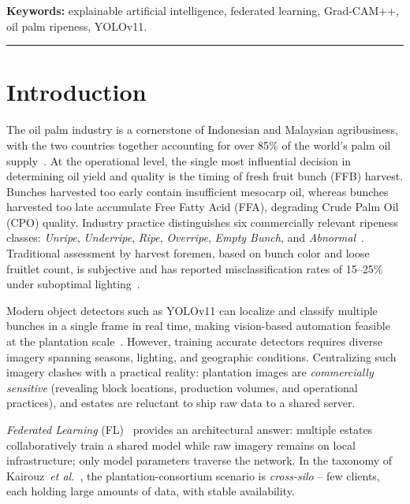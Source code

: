 \documentclass[a4paper,10pt]{article}
\begin{document}
\vspace{0.5em}
\noindent\textbf{Keywords:} explainable artificial intelligence, federated
learning, Grad-CAM++, oil palm ripeness, YOLOv11.

\vspace{1em}
\hrule
\vspace{1em}

\section{Introduction}
The oil palm industry is a cornerstone of Indonesian and Malaysian
agribusiness, with the two countries together accounting for over 85\% of the
world's palm oil supply~\cite{usda2024}. At the operational level, the single
most influential decision in determining oil yield and quality is the timing
of fresh fruit bunch (FFB) harvest. Bunches harvested too early contain
insufficient mesocarp oil, whereas bunches harvested too late accumulate Free
Fatty Acid (FFA), degrading Crude Palm Oil (CPO) quality. Industry practice
distinguishes six commercially relevant ripeness classes: \textit{Unripe},
\textit{Underripe}, \textit{Ripe}, \textit{Overripe}, \textit{Empty Bunch},
and \textit{Abnormal}~\cite{junos2022}. Traditional assessment by harvest
foremen, based on bunch color and loose fruitlet count, is subjective and has
reported misclassification rates of 15--25\% under suboptimal
lighting~\cite{sabri2017}.

Modern object detectors such as YOLOv11 can localize and classify multiple
bunches in a single frame in real time, making vision-based automation
feasible at the plantation scale~\cite{yolov11}. However, training accurate
detectors requires diverse imagery spanning seasons, lighting, and geographic
conditions. Centralizing such imagery clashes with a practical reality:
plantation images are \emph{commercially sensitive} (revealing block
locations, production volumes, and operational practices), and estates are
reluctant to ship raw data to a shared server.

\textit{Federated Learning} (FL)~\cite{fedavg} provides an architectural
answer: multiple estates collaboratively train a shared model while raw
imagery remains on local infrastructure; only model parameters traverse the
network. In the taxonomy of Kairouz~\textit{et al.}~\cite{kairouz2021}, the
plantation-consortium scenario is \textit{cross-silo} -- few clients, each
holding large amounts of data, with stable availability.
\end{document}
